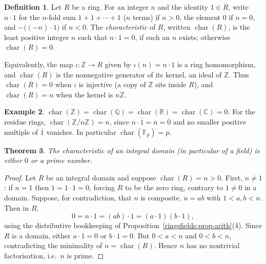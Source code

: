 \documentclass[11pt,a4paper]{article}
\newtheorem{theorem}{Theorem}[section]
\theoremstyle{definition}
\newtheorem{definition}[theorem]{Definition}
\newtheorem{example}[theorem]{Example}
\theoremstyle{remark}
\newcommand{\Z}{\ensuremath{\mathbb{Z}}}
\newcommand{\Q}{\ensuremath{\mathbb{Q}}}
\newcommand{\R}{\ensuremath{\mathbb{R}}}
\providecommand{\C}{}\renewcommand{\C}{\ensuremath{\mathbb{C}}}
\newcommand{\Fp}{\ensuremath{\mathbb{F}_{p}}}
\begin{document}
\begin{definition}\label{ringsfields:def-char}
Let \(R\) be a ring. For an integer \(n\) and the identity \(1\in R\), write \(n\cdot 1\) for the \(n\)-fold sum \(1+1+\cdots+1\) (\(n\) terms) if \(n>0\), the element \(0\) if \(n=0\), and \(-\bigl((-n)\cdot 1\bigr)\) if \(n<0\). The \emph{characteristic} of \(R\), written \(\operatorname{char}(R)\), is the least positive integer \(n\) such that \(n\cdot 1 = 0\), if such an \(n\) exists; otherwise \(\operatorname{char}(R) = 0\).
\end{definition}

Equivalently, the map \(\iota\colon\Z\to R\) given by \(\iota(n) = n\cdot 1\) is a ring homomorphism, and \(\operatorname{char}(R)\) is the nonnegative generator of its kernel, an ideal of \(\Z\). Thus \(\operatorname{char}(R) = 0\) when \(\iota\) is injective (a copy of \(\Z\) sits inside \(R\)), and \(\operatorname{char}(R) = n\) when the kernel is \(n\Z\).

\begin{example}\label{ringsfields:exa-char}
\(\operatorname{char}(\Z) = \operatorname{char}(\Q) = \operatorname{char}(\R) = \operatorname{char}(\C) = 0\). For the residue rings, \(\operatorname{char}(\Z/n\Z) = n\), since \(n\cdot\overline 1 = \overline n = \overline 0\) and no smaller positive multiple of \(\overline 1\) vanishes. In particular \(\operatorname{char}(\Fp) = p\).
\end{example}

\begin{theorem}\label{ringsfields:thm-char-prime}
The characteristic of an integral domain (in particular of a field) is either \(0\) or a prime number.
\end{theorem}

\begin{proof}
Let \(R\) be an integral domain and suppose \(\operatorname{char}(R) = n > 0\). First, \(n\neq 1\): if \(n=1\) then \(1 = 1\cdot 1 = 0\), forcing \(R\) to be the zero ring, contrary to \(1\neq 0\) in a domain. Suppose, for contradiction, that \(n\) is composite, \(n = ab\) with \(1 < a,b < n\). Then in \(R\),
\[
0 = n\cdot 1 = (ab)\cdot 1 = (a\cdot 1)(b\cdot 1),
\]
using the distributive bookkeeping of Proposition~\ref{ringsfields:prop-arith}(4). Since \(R\) is a domain, either \(a\cdot 1 = 0\) or \(b\cdot 1 = 0\). But \(0<a<n\) and \(0<b<n\), contradicting the minimality of \(n=\operatorname{char}(R)\). Hence \(n\) has no nontrivial factorisation, i.e.\ \(n\) is prime.
\end{proof}
\end{document}

